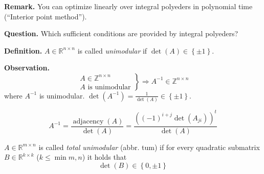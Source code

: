 \documentclass{article}
\newcommand{\set}[1]{\left\{#1\right\}}
\begin{document}
\textbf{Remark.}
  You can optimize linearly over integral polyeders in polynomial time (``Interior point method'').

\textbf{Question.}
  Which sufficient conditions are provided by integral polyeders?

\textbf{Definition.}
  $A \in \mathbb{R}^{n\times n}$ is called \emph{unimodular} if $\det(A) \in \set{\pm 1}$.

\textbf{Observation.}
  \[
    \left.\begin{array}{c}
      A \in \mathbb{Z}^{n\times n} \\
      A \text{ is unimodular}
    \end{array}\right\}
    \Rightarrow A^{-1} \in \mathbb{Z}^{n\times n}
  \]
  where $A^{-1}$ is unimodular. $\det(A^{-1}) = \frac{1}{\det(A)} \in \set{\pm 1}$.

\[ A^{-1} = \frac{\operatorname{adjacency}(A)}{\det(A)} = \frac{((-1)^{i+j} \det(A_{ji}))^t}{\det(A)} \]

$A \in \mathbb{R}^{m \times n}$ is called \emph{total unimodular} (abbr. tum) if for every quadratic submatrix $B \in \mathbb{R}^{k\times k}$ ($k \leq \min{m,n}$) it holds that
\[ \det(B) \in \set{0, \pm 1} \]
\end{document}
